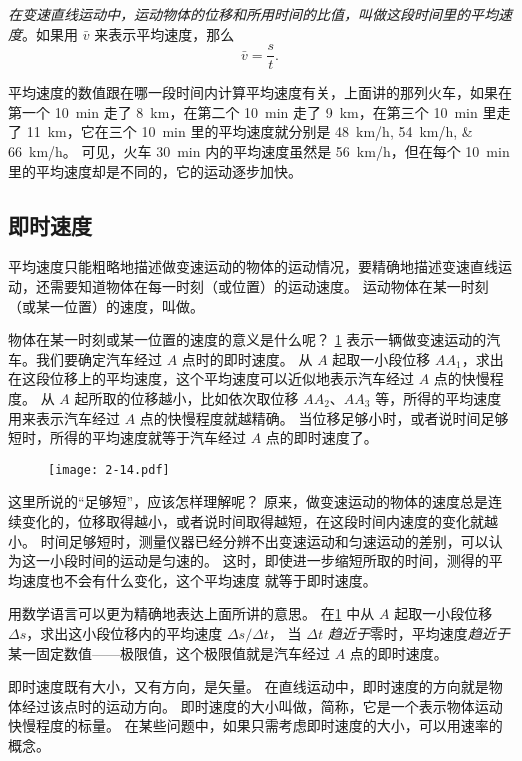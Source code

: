 \emph{在变速直线运动中，运动物体的位移和所用时间的比值，叫做这段时间里的平均速度}。如果用 $\bar v$ 来表示平均速度，那么
\[\bar v=\frac{s}{t}.\]

平均速度的数值跟在哪一段时间内计算平均速度有关，上面讲的那列火车，如果在第一个 \qty{10}{min} 走了 \qty{8}{km}，在第二个 \qty{10}{min} 走了 \qty{9}{km}，在第三个 \qty{10}{min} 里走了 \qty{11}{km}，它在三个 \qty{10}{min} 里的平均速度就分别是 \qtylist{48;54;66}{km/h}。
可见，火车 \qty{30}{min} 内的平均速度虽然是 \qty{56}{km/h}，但在每个 \qty{10}{min} 里的平均速度却是不同的，它的运动逐步加快。

\subsection{即时速度}
平均速度只能粗略地描述做变速运动的物体的运动情况，要精确地描述变速直线运动，还需要知道物体在每一时刻（或位置）的运动速度。
运动物体在某一时刻（或某一位置）的速度，叫做。

物体在某一时刻或某一位置的速度的意义是什么呢？
\cref{fig:2-14} 表示一辆做变速运动的汽车。我们要确定汽车经过 $A$ 点时的即时速度。
从 $A$ 起取一小段位移 $AA_1$，求出在这段位移上的平均速度，这个平均速度可以近似地表示汽车经过 $A$ 点的快慢程度。
从 $A$ 起所取的位移越小，比如依次取位移 $AA_2$、$AA_3$ 等，所得的平均速度用来表示汽车经过 $A$ 点的快慢程度就越精确。
当位移足够小时，或者说时间足够短时，所得的平均速度就等于汽车经过 $A$ 点的即时速度了。

\begin{figure}
  \texttt{[image: 2-14.pdf]}
  \caption{}\label{fig:2-14}
\end{figure}

这里所说的“足够短”，应该怎样理解呢？
原来，做变速运动的物体的速度总是连续变化的，位移取得越小，或者说时间取得越短，在这段时间内速度的变化就越小。
时间足够短时，测量仪器已经分辨不出变速运动和匀速运动的差别，可以认为这一小段时间的运动是匀速的。
这时，即使进一步缩短所取的时间，测得的平均速度也不会有什么变化，这个平均速度
就等于即时速度。

用数学语言可以更为精确地表达上面所讲的意思。
在\cref{fig:2-14} 中从 $A$ 起取一小段位移 $\Delta s$，求出这小段位移内的平均速度 $\Delta s/\Delta t$， 当 $\Delta t$ \emph{趋近于}零时，平均速度\emph{趋近于}某一固定数值——极限值，这个极限值就是汽车经过 $A$ 点的即时速度。

即时速度既有大小，又有方向，是矢量。
在直线运动中，即时速度的方向就是物体经过该点时的运动方向。
即时速度的大小叫做，简称，它是一个表示物体运动快慢程度的标量。
在某些问题中，如果只需考虑即时速度的大小，可以用速率的概念。

